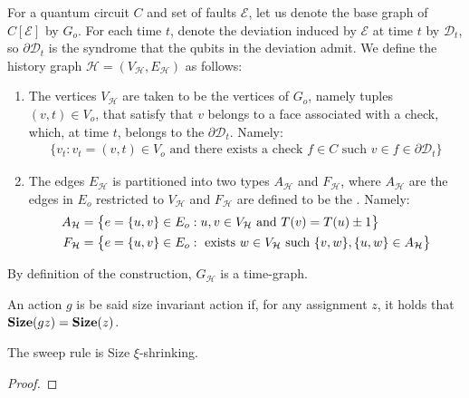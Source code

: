   \begin{definition}
    For a quantum circuit $C$ and set of faults $\mathcal{E}$, let us denote the base graph of $C[\mathcal{E}]$ by $G_{o}$. For each time $t$, denote the deviation induced by $\mathcal{E}$ at time $t$ by $\mathcal{D}_{t}$, so $\partial\mathcal{D}_{t}$ is the syndrome that the qubits in the deviation admit. We define the history graph $\mathcal{H} = ( V_{\mathcal{H}}, E_{\mathcal{H}})$ as follows: 
    \begin{enumerate}
      \item The vertices $V_{\mathcal{H}}$ are taken to be the vertices of $G_{o}$, namely tuples $(v,t) \in V_{o}$, that satisfy that $v$ belongs to a face associated with a check, which, at time $t$, belongs to the $\partial \mathcal{D}_{t}$. Namely:
        \begin{equation*}
          \begin{split}
            \big\{ v_{t} : v_{t}=(v,t) \in V_{o} \text{ and there exists a check } f \in C \text{ such } v \in f \in \partial \mathcal{D}_{t} \big\}
          \end{split}
        \end{equation*}
      \item The edges $E_{\mathcal{H}}$ is partitioned into two types $A_{\mathcal{H}}$ and $F_{\mathcal{H}}$, where $A_{\mathcal{H}}$ are the edges in $E_{o}$ restricted to $V_{\mathcal{H}}$ and $F_{\mathcal{H}}$ are defined to be the . Namely:
        \begin{equation*}
          \begin{split}
            A_{\mathcal{H}} &= \big\{ e = \{u,v\} \in E_{o} :  u,v \in V_{\mathcal{H}} \text{ and } T(v) = T(u)\pm 1 \big\} \\
            F_{\mathcal{H}} &= \big\{ e = \{u,v\} \in E_{o} : \text{ exists } w \in V_{\mathcal{H}} \text{ such } \{v,w\},\{u,w\} \in A_{\mathcal{H}} \big\} 
          \end{split}
        \end{equation*}
    \end{enumerate}
    By definition of the construction, $G_{\mathcal{H}}$ is a time-graph.
\end{definition}



  \begin{definition}
An action $g$ is be said size invariant action if, for any assignment $z$, it holds that $\mathbf{Size}(gz) = \mathbf{Size}(z)$. 
  \end{definition}

  \begin{claim}
    The sweep rule is Size $\xi$-shrinking.
  \end{claim}
  \begin{proof}
    
  \end{proof}


